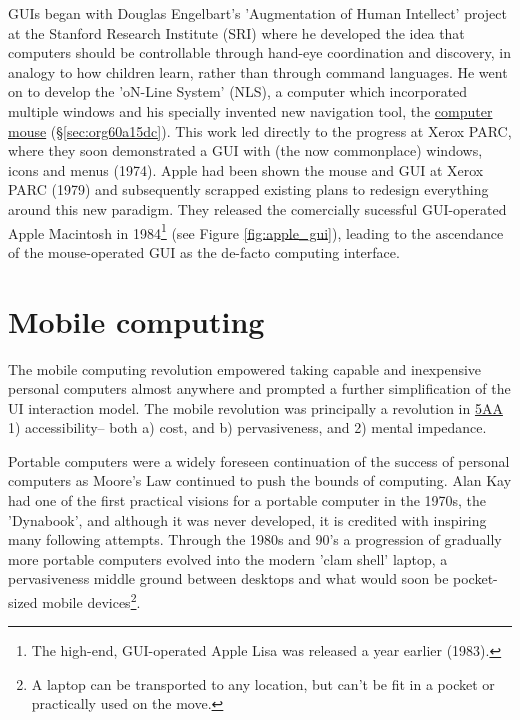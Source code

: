 \documentclass[logo,bsc,singlespacing,parskip]{infthesis}
\begin{document}
GUIs began with Douglas Engelbart's 'Augmentation of Human Intellect' project at the Stanford Research Institute (SRI) where he developed the idea that computers should be controllable through hand-eye coordination and discovery, in analogy to how children learn, rather than through command languages.
He went on to develop the 'oN-Line System' (NLS), a computer which incorporated multiple windows and his specially invented new navigation tool, the \hyperref[sec:org60a15dc]{computer mouse} (\S \ref{sec:org60a15dc}).
This work led directly to the progress at Xerox PARC, where they soon demonstrated a GUI with (the now commonplace) windows, icons and menus (1974).
Apple had been shown the mouse and GUI at Xerox PARC (1979) and subsequently scrapped existing plans to redesign everything around this new paradigm.
They released the comercially sucessful GUI-operated Apple Macintosh in 1984\footnote{The high-end, GUI-operated Apple Lisa was released a year earlier (1983).} (see Figure \ref{fig:apple_gui}),  leading to the ascendance of the mouse-operated GUI as the de-facto computing interface.

\section{Mobile computing}
\label{sec:orgadc8069}
The mobile computing revolution empowered taking capable and inexpensive personal computers almost anywhere and prompted a further simplification of the UI interaction model.
The mobile revolution was principally a revolution in \hyperref[org7b75b93]{5AA} 1) accessibility-- both a) cost, and b) pervasiveness, and 2) mental impedance.

Portable computers were a widely foreseen continuation of the success of personal computers as Moore's Law continued to push the bounds of computing.
Alan Kay had one of the first practical visions for a portable computer in the 1970s, the 'Dynabook', and although it was never developed, it is credited with inspiring many following attempts.
Through the 1980s and 90's a progression of gradually more portable computers evolved into the modern 'clam shell' laptop, a pervasiveness middle ground between desktops and what would soon be pocket-sized mobile devices\footnote{A laptop can be transported to any location, but can't be fit in a pocket or practically used on the move.}.
\end{document}
